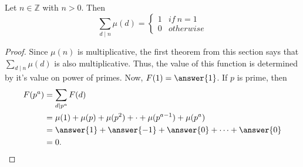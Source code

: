 \documentclass{ximera}
\begin{document}
\begin{theorem}
 Let $n\in\mathbb{Z}$ with $n>0$. Then \[\displaystyle\sum_{d\mid n} \mu(d)=
\begin{cases}
 1 & if\ n=1\\
 0 & otherwise
\end{cases}\]
\end{theorem}
\begin{proof}
 Since $\mu(n)$ is multiplicative, the first theorem from this section says that $\displaystyle\sum_{d\mid n} \mu(d)$ is also multiplicative. Thus, the value of this function is determined by it's value on power of primes. Now, $F(1)=\answer{1}
 $. If $p$ is prime, then 
\begin{align*}
 F(p^a)&=\displaystyle\sum_{d\mid p^a} F(d)\\
 &=\mu(1)+\mu(p)+\mu(p^2)+\cdot+\mu(p^{a-1})+\mu(p^a)\\
 &=\answer{1}
 +\answer{-1}
 +\answer{0}
 +\cdots+\answer{0}
\\ &=0.
\end{align*}
\end{proof}
\end{document}
